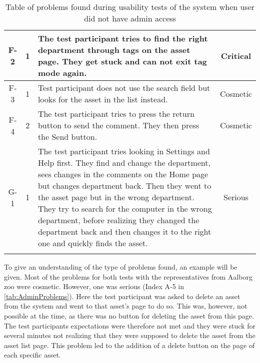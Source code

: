 \begin{longtable}{| c | c | p{8cm} | c |}
        \\
        \hline
        F-2 & 1 & The test participant tries to find the right department through tags on the asset page. They get stuck and can not exit tag mode again. &  Critical
        \\
        \hline
        F-3 & 1 & Test participant does not use the search field but looks for the asset in the list instead. & Cosmetic
        \\
        \hline
        F-4 & 2 & The test participant tries to press the return button to send the comment. They then press the Send button. & Cosmetic
        \\
        \hline
        G-1 & 1 & The test participant tries looking in Settings and Help first. They find and change the department, sees changes in the comments on the Home page but changes department back. Then they went to the asset page but in the wrong department. They try to search for the computer in the wrong department, before realizing they changed the department back and then changes it to the right one and quickly finds the asset. & Serious
        \\
        \hline
        
    \caption{Table of problems found during usability tests of the system when user did not have admin access}
    \label{tab:EmployeeProblems}
   
\end{longtable}

To give an understanding of the type of problems found, an example will be given. Most of the problems for both tests with the representatives from Aalborg zoo were cosmetic. However, one was serious (Index A-5 in \autoref{tab:AdminProblems}). Here the test participant was asked to delete an asset from the system and went to that asset's page to do so. This was, however, not possible at the time, as there was no button for deleting the asset from this page. The test participants expectations were therefore not met and they were stuck for several minutes not realizing that they were supposed to delete the asset from the asset list page. This problem led to the addition of a delete button on the page of each specific asset.